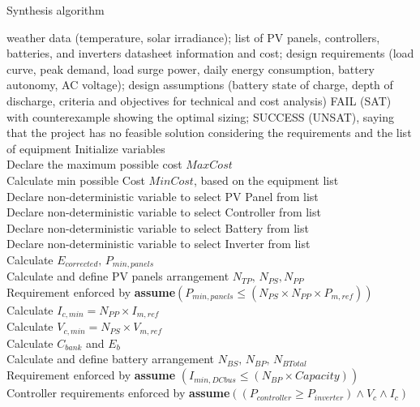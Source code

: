 \documentclass[runningheads]{llncs}
\begin{document}
%
 \begin{algorithm}
 \caption{Synthesis algorithm}
 \begin{algorithmic}[1]
 \renewcommand{\algorithmicrequire}{\textbf{Input:}}
 \renewcommand{\algorithmicensure}{\textbf{Output:}}
  \REQUIRE weather data (temperature, solar irradiance); list of PV panels, controllers, batteries, and inverters datasheet information and cost; design requirements (load curve, peak demand, load surge power, daily energy consumption, battery autonomy, AC voltage); design assumptions (battery state of charge, depth of discharge, criteria and objectives for technical and cost analysis)
 \ENSURE FAIL (SAT) with counterexample showing the optimal sizing; SUCCESS (UNSAT), saying that the project has no feasible solution considering the requirements and the list of equipment
  \STATE Initialize variables \\
  \STATE Declare the maximum possible cost $MaxCost$  \\
  \STATE Calculate min possible Cost $MinCost$, based on the equipment list \\
 	\STATE Declare non-deterministic variable to select PV Panel from list \\
 	\STATE Declare non-deterministic variable to select Controller from list \\
 	\STATE Declare non-deterministic variable to select Battery from list \\
 	\STATE Declare non-deterministic variable to select Inverter from list \\ 	
 	\STATE Calculate $E_{corrected}, \, P_{min,panels} $ \\
	\STATE Calculate and define PV panels arrangement $N_{TP}, \, N_{PS}, N_{PP} $ \\
	\STATE Requirement enforced by \textbf{assume}$(P_{min,panels} \leq (N_{PS} \times N_{PP} \times P_{m,ref}))$ \\
	\STATE Calculate $I_{c,min} = N_{PP} \times I_{m,ref}$ \\
	\STATE Calculate $V_{c,min} = N_{PS} \times V_{m,ref}$ \\
 	\STATE Calculate $C_{bank}$ and $E_{b}$ \\
	\STATE Calculate and define battery arrangement $N_{BS}, \, N_{BP}, \, N_{BTotal}$ \\
	\STATE Requirement enforced by \textbf{assume} $(I_{min,DCbus} \leq (N_{BP} \times Capacity))$ \\
 	\STATE Controller requirements enforced by \textbf{assume}$((P_{controller} \geq P_{inverter}) \wedge V_{c} \wedge I_{c})$ \\

\end{algorithmic}
\end{algorithm}
\end{document}
